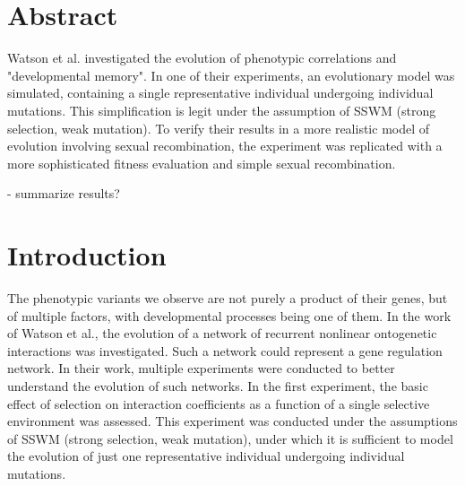 \documentclass{article}
\begin{document}





\section{Abstract}

Watson et al. investigated the evolution of phenotypic correlations and "developmental memory". In one of their experiments, an evolutionary model was simulated, containing a single representative individual undergoing individual mutations. This simplification is legit under the assumption of SSWM (strong selection, weak mutation). 
To verify their results in a more realistic model of evolution involving sexual recombination, the experiment was replicated with a more sophisticated fitness evaluation and simple sexual recombination.

- summarize results?

\section{Introduction}

The phenotypic variants we observe are not purely a product of their genes, but of multiple factors, with developmental processes being one of them. In the work of Watson et al., the evolution of a network of recurrent nonlinear ontogenetic interactions was investigated. Such a network could represent a gene regulation network. In their work, multiple experiments were conducted to better understand the evolution of such networks. In the first experiment, the basic effect of selection on interaction coefficients as a function of a single selective environment was assessed. This experiment was conducted under the assumptions of SSWM (strong selection, weak mutation), under which it is sufficient to model the evolution of just one representative individual undergoing individual mutations. 
\end{document}
